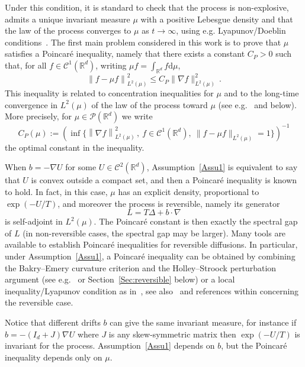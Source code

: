 \documentclass[10pt]{amsart}
\theoremstyle{definition}\newtheorem{defi}[theo]{Definition}\newtheorem{rema}[theo]{Remark}\newtheorem{exam}[theo]{Example}\newtheorem{exem}[theo]{Example}\newtheorem{nota}[theo]{Notation}
\newcommand{\R}{\mathbb R}
\newcommand{\clP}{\mathcal P}
\newcommand{\clC}{\mathcal C}
\newcommand{\dd}{\mathrm{d}}
\newcommand{\na}{\nabla}
\newcommand{\1}{\mathbbm{1}}
\begin{document}
Under this condition, it is standard to check that the process is non-explosive, admits a unique invariant measure $\mu$ with a positive Lebesgue density and that the law of the process converges to $\mu$ as $t\rightarrow \infty$, using e.g. Lyapunov/Doeblin conditions~\cite{BakryCattiauxGuillin,HairerMattingly2008,MeynTweedieLivre}. The first main problem considered in this work is to prove that $\mu$ satisfies a Poincaré inequality, namely that there exists a constant $C_P>0$ such that, for all $f\in\clC^1(\R^d)$, writing $\mu f= \int_{\R^d} f \dd \mu$,
\[
\left\| f - \mu f\right\|_{L^2(\mu)}^2 \leqslant C_P \| \na f\|_{L^2(\mu)}^2\,.
\]
This inequality is related to concentration inequalities for $\mu$ and to the long-time convergence in $L^2(\mu)$ of the law of the process toward $\mu$ (see e.g.~\cite{BakryGentilLedoux,CattiauxGuillinDeviation} and below). More precisely, for $\mu \in \clP(\R^d)$ we write
\[
C_P(\mu) := \left( \inf\{ \left\| \na f\right\|_{L^2(\mu)}^2\,, \ f\in \clC^1(\R^d),\ \| f - \mu f\|_{L^2(\mu)} =1\}\right)^{-1}
\]
the optimal constant in the inequality.

When $b=-\na U$ for some $U\in\clC^2(\R^d)$, Assumption~\ref{Assu1} is equivalent to say that $U$ is convex outside a compact set, and then a Poincaré inequality is known to hold. In fact, in this case, $\mu$ has an explicit density, proportional to $\exp(-U/T)$, and moreover the process is reversible, namely its generator
\begin{equation}\label{eq:generateur}
L = T\Delta + b\cdot \na
\end{equation}
is self-adjoint in $L^2(\mu)$. The Poincaré constant is then exactly the spectral gap of $L$ (in non-reversible cases, the spectral gap may be larger). Many tools are available to establish Poincaré inequalities for reversible diffusions. In particular, under Assumption~\ref{Assu1}, a Poincaré inequality can be obtained by combining the Bakry--Emery curvature criterion and the Holley--Stroock perturbation argument (see e.g.~\cite[Propositions~4.2.7 and Proposition~4.8.1]{BakryGentilLedoux} or Section~\ref{Sec:reversible} below) or a local inequality/Lyapunov condition as in~\cite{BakryCattiauxGuillin,CattiauxGuillin}, see also~\cite{BakryCattiauxGuillin,BakryGentilLedoux,CattiauxGuillinFathi} and references within concerning the reversible case.



Notice that different drifts $b$ can give the same invariant measure, for instance if $b = -(I_d +J)\na U$ where $J$ is any skew-symmetric matrix then $\exp(-U/T)$ is invariant for the process. Assumption~\ref{Assu1} depends on $b$, but the Poincaré inequality depends only on $\mu$.
\end{document}

